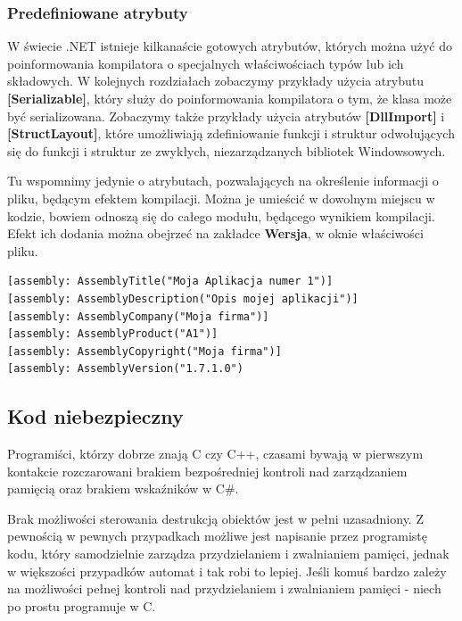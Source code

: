 \subsubsection{Predefiniowane atrybuty}

W świecie .NET istnieje kilkanaście gotowych atrybutów, których można użyć do poinformowania
kompilatora o specjalnych właściwościach typów lub ich składowych. W kolejnych rozdziałach zobaczymy 
przykłady użycia atrybutu {\bf [Serializable]}, który służy do poinformowania kompilatora o tym, że
klasa może być serializowana. Zobaczymy także przykłady użycia atrybutów {\bf [DllImport]} i
{\bf [StructLayout]}, które umożliwiają zdefiniowanie funkcji i struktur odwołujących się
do funkcji i struktur ze zwykłych, niezarządzanych bibliotek Windowsowych.

Tu wspomnimy jedynie o atrybutach, pozwalających na określenie informacji o pliku, będącym efektem kompilacji.
Można je umieścić w dowolnym miejscu w kodzie, bowiem odnoszą się do całego modułu, będącego wynikiem
kompilacji. Efekt ich dodania można obejrzeć na zakładce {\bf Wersja}, w oknie właściwości pliku.

\begin{scriptsize}
\begin{verbatim}
[assembly: AssemblyTitle("Moja Aplikacja numer 1")]
[assembly: AssemblyDescription("Opis mojej aplikacji")]
[assembly: AssemblyCompany("Moja firma")]
[assembly: AssemblyProduct("A1")]
[assembly: AssemblyCopyright("Moja firma")]
[assembly: AssemblyVersion("1.7.1.0")
\end{verbatim}
\end{scriptsize}

\subsection{Kod niebezpieczny}

Programiści, którzy dobrze znają C czy C++, czasami bywają w pierwszym kontakcie rozczarowani brakiem
bezpośredniej kontroli nad zarządzaniem pamięcią oraz brakiem wskaźników w C\#.

Brak możliwości sterowania destrukcją obiektów jest w pełni uzasadniony. Z pewnością w pewnych przypadkach
możliwe jest napisanie przez programistę kodu, który samodzielnie zarządza przydzielaniem i zwalnianiem pamięci,
jednak w większości przypadków automat i tak robi to lepiej. Jeśli komuś bardzo zależy na możliwości
pełnej kontroli nad przydzielaniem i zwalnianiem pamięci - niech po prostu programuje w C.

